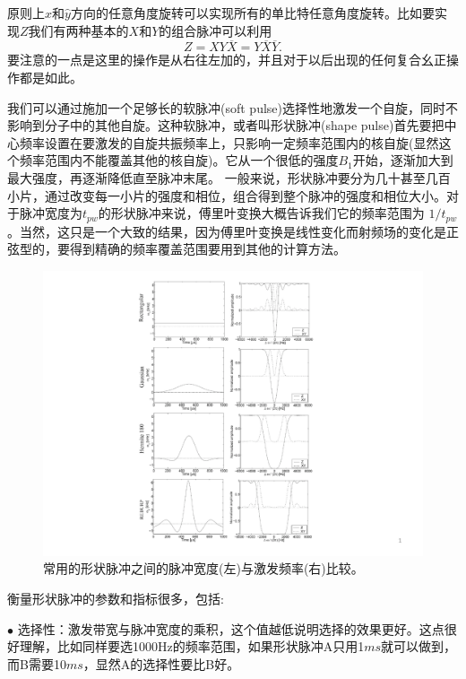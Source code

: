 原则上$\hat{x}$和$\hat{y}$方向的任意角度旋转可以实现所有的单比特任意角度旋转。比如要实现$Z$我们有两种基本的$X$和$Y$的组合脉冲可以利用
\begin{equation}\label{aaa}
Z = XY\overline{X} = Y\overline{X}\overline{Y}.
\end{equation}
要注意的一点是这里的操作是从右往左加的，并且对于以后出现的任何复合幺正操作都是如此。

我们可以通过施加一个足够长的软脉冲(soft pulse)选择性地激发一个自旋，同时不影响到分子中的其他自旋。这种软脉冲，或者叫形状脉冲(shape pulse)首先要把中心频率设置在要激发的自旋共振频率上，只影响一定频率范围内的核自旋(显然这个频率范围内不能覆盖其他的核自旋)。它从一个很低的强度$B_1$开始，逐渐加大到最大强度，再逐渐降低直至脉冲末尾。
一般来说，形状脉冲要分为几十甚至几百小片，通过改变每一小片的强度和相位，组合得到整个脉冲的强度和相位大小。对于脉冲宽度为$t_{pw}$的形状脉冲来说，傅里叶变换大概告诉我们它的频率范围为
$1/t_{pw}$。当然，这只是一个大致的结果，因为傅里叶变换是线性变化而射频场的变化是正弦型的，要得到精确的频率覆盖范围要用到其他的计算方法。

\begin{figure}[htbp]
            \begin{center}
              \includegraphics[width= 0.8\columnwidth]{figures/shape.pdf}
              \caption{常用的形状脉冲之间的脉冲宽度(左)与激发频率(右)比较。
              }
              \label{shape}
            \end{center}
\end{figure}

衡量形状脉冲的参数和指标很多，包括:

$\bullet$ 选择性：激发带宽与脉冲宽度的乘积，这个值越低说明选择的效果更好。这点很好理解，比如同样要选1000Hz的频率范围，如果形状脉冲A只用1$ms$就可以做到，而B需要10$ms$，显然A的选择性要比B好。

